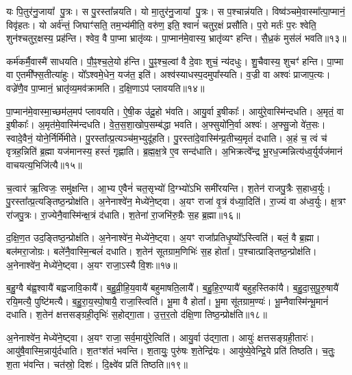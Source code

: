 यः पि॒तुर॑नु॒जाया᳚ पु॒त्रः।
स पु॒रस्ता᳚न्नयति।
यो मा॒तुर॑नु॒जाया᳚ पु॒त्रः।
स प॒श्चान्न॑यति।
विष्व॑ञ्चमे॒वास्मा᳚त्पा॒प्मानं॒ विवृ॑हतः।
यो अर्व॑न्तं॒ जिघाꣳ॑सति॒ तम॒भ्य॑मीति॒ वरु॑ण॒ इति॒ श्वानं॑ चतुर॒क्षं प्रसौ॑ति।
प॒रो मर्तः॑ प॒रः श्वेति॒ शुन॑श्चतुर॒क्षस्य॒ प्रह॑न्ति।
श्वेव॒ वै पा॒प्मा भ्रातृ॑व्यः।
पा॒प्मान॑मे॒वास्य॒ भ्रातृ॑व्यꣳ हन्ति।
सै॒ध्र॒कं मुस॑लं भवति॥१३॥

कर्म॑कर्मै॒वास्मै॑ साधयति।
पौ॒ꣴ॒श्च॒ले॒यो ह॑न्ति।
पु॒ꣴ॒श्च॒ल्वां वै दे॒वाः शुचं॒ न्य॑दधुः।
शु॒चैवास्य॒ शुचꣳ॑ हन्ति।
पा॒प्मा वा ए॒तमी᳚फ्स॒तीत्या॑हुः।
यो᳚ऽश्वमे॒धेन॒ यज॑त॒ इति॑।
अश्व॑स्याधस्प॒दमुपा᳚स्यति।
व॒ज्री वा अश्वः॑ प्राजाप॒त्यः।
वज्रे॑णै॒व पा॒प्मानं॒ भ्रातृ॑व्य॒मव॑\-क्रामति।
द॒क्षि॒णाऽप॑ प्लावयति॥१४॥

पा॒प्मान॑मे॒वास्मा॒च्छम॑ल॒मप॑ प्लावयति।
ऐ॒षी॒क उ॑दू॒हो भ॑वति।
आयु॒र्वा इ॒षीकाः᳚।
आयु॑रे॒वास्मि॑न्दधति।
अ॒मृतं॒ वा इ॒षीकाः᳚।
अ॒मृत॑मे॒वास्मि॑न्दधति।
वे॒त॒स॒शा॒खोप॒सम्ब॑द्धा भवति।
अ॒फ्सुयो॑नि॒र्वा अश्वः॑।
अ॒फ्सु॒जो वे॑त॒सः।
स्वादे॒वैनं॒ योने॒र्निर्मि॑मीते।
पु॒रस्ता᳚त्प्र॒त्यञ्च॑म॒भ्युदू॑हति।
पु॒रस्ता॑दे॒वास्मि॑न्प्र॒तीच्य॒मृतं॑ दधाति।
अ॒हं च॒ त्वं च॑ वृत्रह॒न्निति॑ ब्र॒ह्मा यज॑मानस्य॒ हस्तं॑ गृह्णाति।
ब्र॒ह्म॒क्ष॒त्रे ए॒व सन्द॑धाति।
अ॒भिक्रत्वे᳚न्द्र भू॒रध॒ज्मन्नित्य॑ध्व॒र्युर्यज॑मानं वाचयत्य॒भिजि॑त्यै॥१५॥\anuvakamend[भ॒व॒ति॒ प्ला॒व॒य॒ति॒ मि॒मी॒ते॒ पञ्च॑ च]

च॒त्वार॑ ऋ॒त्विजः॒ समु॑क्षन्ति।
आ॒भ्य ए॒वैनं॑ चत॒सृभ्यो॑ दि॒ग्भ्यो॑ऽभि समी॑रयन्ति।
श॒तेन॑ राजपु॒त्रैः स॒हाध्व॒र्युः।
पु॒रस्ता᳚त्प्र॒त्यङ्तिष्ठ॒न्प्रोक्ष॑ति।
अ॒नेनाश्वे॑न॒ मेध्ये॑ने॒ष्ट्वा।
अ॒यꣳ राजा॑ वृ॒त्रं व॑ध्या॒दिति॑।
रा॒ज्यं वा अ॑ध्व॒र्युः।
क्ष॒त्रꣳ रा॑जपु॒त्रः।
रा॒ज्ये\-नै॒वास्मि॑न्क्ष॒त्रं द॑धाति।
श॒तेना॑ रा॒जभि॑रु॒ग्रैः स॒ह ब्र॒ह्मा॥१६॥

द॒क्षि॒ण॒त उद॒ङ्तिष्ठ॒न्प्रोक्ष॑ति।
अ॒नेनाश्वे॑न॒ मेध्ये॑ने॒ष्ट्वा।
अ॒यꣳ राजा᳚प्रतिधृ॒ष्यो᳚\-ऽस्त्विति॑।
बलं॒ वै ब्र॒ह्मा।
बल॑मरा॒जोग्रः।
बले॑नै॒वास्मि॒न्बलं॑ दधाति।
श॒तेन॑ सूतग्राम॒णिभिः॑ स॒ह होता᳚।
प॒श्चात्प्राङ्तिष्ठ॒न्प्रोक्ष॑ति।
अ॒नेनाश्वे॑न॒ मेध्ये॑ने॒ष्ट्वा।
अ॒यꣳ राजा॒\-ऽस्यै वि॒शः॥१७॥

ब॒हु॒ग्वै ब॑ह्व॒श्वायै॑ बह्वजावि॒कायै᳚।
ब॒हु॒व्री॒हि॒य॒वायै॑ बहुमाषति॒लायै᳚।
ब॒हु॒हि॒र॒ण्यायै॑ बहुह॒स्तिका॑यै।
ब॒हु॒दा॒स॒\-पू॒रु॒षायै॑ रयि॒मत्यै॒ पुष्टि॑मत्यै।
ब॒हु॒रा॒य॒स्पो॒षायै॒ राजा॒स्त्विति॑।
भू॒मा वै होता᳚।
भू॒मा सू॑तग्राम॒ण्यः॑।
भू॒म्नैवास्मि॑न्भू॒मानं॑ दधाति।
श॒तेन॑ क्षत्तसङ्ग्रही॒तृभिः॑ स॒होद्गा॒ता।
उ॒त्त॒र॒तो द॑क्षि॒णा तिष्ठ॒न्प्रोक्ष॑ति॥१८॥

अ॒नेनाश्वे॑न॒ मेध्ये॑ने॒ष्ट्वा।
अ॒यꣳ राजा॒ सर्व॒मायु॑रे॒त्विति॑।
आयु॒र्वा उ॑द्गा॒ता।
आयुः॑ क्षत्तसङ्ग्रही॒तारः॑।
आयु॑षै॒वास्मि॒न्नायु॑र्द\-धाति।
श॒तꣳश॑तं भवन्ति।
श॒तायुः॒ पुरु॑षः श॒तेन्द्रि॑यः।
आयु॑ष्ये॒वेन्द्रि॒ये प्रति॑ तिष्ठति।
च॒तुः॒ श॒ता भ॑वन्ति।
चत॑स्रो॒ दिशः॑।
दि॒क्ष्वे॑व प्रति॑ तिष्ठति॥१९॥\anuvakamend[ब्र॒ह्मा वि॒श उ॑क्षति॒ दिश॒ एकं॑ च]

